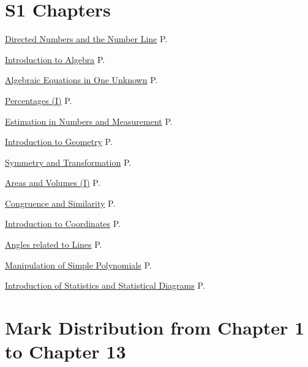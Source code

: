 \documentclass[12pt, a4paper]{article}
\begin{document}
\newpage
\section*{S1 Chapters}
\begin{enumx}[label=Ch \arabic*. , leftmargin=2cm,rightmargin=0pt,labelwidth=17mm, itemsep=3pt, topsep=3mm, labelsep=2mm, labelindent=0pt, align=left, partopsep=0mm ]
\item \hyperref[chapter:S1-1]{Directed Numbers and the Number Line} \hfill P.\pageref{chapter:S1-1}
\item \hyperref[chapter:S1-2]{Introduction to Algebra} \hfill P.\pageref{chapter:S1-2}
\item \hyperref[chapter:S1-3]{Algebraic Equations in One Unknown} \hfill P.\pageref{chapter:S1-3}
\item \hyperref[chapter:S1-4]{Percentages (I)} \hfill P.\pageref{chapter:S1-4}
\item \hyperref[chapter:S1-5]{Estimation in Numbers and Measurement} \hfill P.\pageref{chapter:S1-5}
\item \hyperref[chapter:S1-6]{Introduction to Geometry} \hfill P.\pageref{chapter:S1-6}
\item \hyperref[chapter:S1-7]{Symmetry and Transformation} \hfill P.\pageref{chapter:S1-7}
\item \hyperref[chapter:S1-8]{Areas and Volumes (I)} \hfill P.\pageref{chapter:S1-8}
\item \hyperref[chapter:S1-9]{Congruence and Similarity} \hfill P.\pageref{chapter:S1-9}
\item \hyperref[chapter:S1-10]{Introduction to Coordinates} \hfill P.\pageref{chapter:S1-10}
\item \hyperref[chapter:S1-11]{Angles related to Lines} \hfill P.\pageref{chapter:S1-11}
\item \hyperref[chapter:S1-12]{Manipulation of Simple Polynomials} \hfill P.\pageref{chapter:S1-12}
\item \hyperref[chapter:S1-13]{Introduction of Statistics and Statistical Diagrams} \hfill P.\pageref{chapter:S1-13}
\end{enumx}
\section*{Mark Distribution from Chapter 1 to Chapter 13}
\begin{center}
\end{center}
\end{document}
